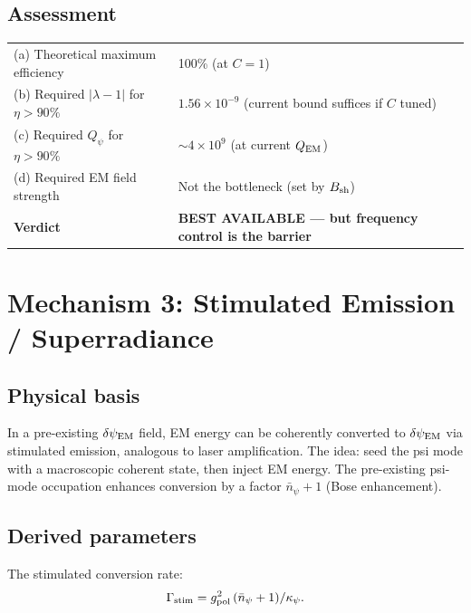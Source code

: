 \documentclass[11pt]{article}
\newcommand{\ee}[1]{\times 10^{#1}}
\newcommand{\dpsiEM}{\delta\psi_{\rm EM}}
\newcommand{\lambdaone}{|\lambda{-}1|}
\newcommand{\Qpsi}{Q_\psi}
\newcommand{\QEM}{Q_{\rm EM}}
\begin{document}
\subsection{Assessment}

\begin{center}
\begin{tabular}{ll}
\toprule
(a) Theoretical maximum efficiency & 100\% (at $C=1$) \\
(b) Required $\lambdaone$ for $\eta > 90\%$ & $1.56\ee{-9}$ (current bound suffices if $C$ tuned) \\
(c) Required $\Qpsi$ for $\eta > 90\%$ & $\sim 4\ee{9}$ (at current $\QEM$) \\
(d) Required EM field strength & Not the bottleneck (set by $B_{\rm sh}$) \\
\midrule
\textbf{Verdict} & \textbf{BEST AVAILABLE --- but frequency control is the barrier} \\
\bottomrule
\end{tabular}
\end{center}

\section{Mechanism 3: Stimulated Emission / Superradiance}
\label{sec:mech-stimulated}

\subsection{Physical basis}

In a pre-existing $\dpsiEM$ field, EM energy can be coherently converted
to $\dpsiEM$ via stimulated emission, analogous to laser amplification.
The idea: seed the psi mode with a macroscopic coherent state, then
inject EM energy. The pre-existing psi-mode occupation enhances
conversion by a factor $\bar{n}_\psi + 1$ (Bose enhancement).

\subsection{Derived parameters}

The stimulated conversion rate:
\begin{equation}
\Gamma_{\rm stim} = g_{\rm pol}^2\,(\bar{n}_\psi + 1)/\kappa_\psi.
\end{equation}
\end{document}
